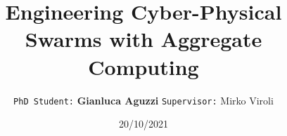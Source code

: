 

\title{
  {\fontfamily{\playfairfamily}\selectfont
  Engineering Cyber-Physical Swarms with Aggregate Computing
  }  
}
\author[G.Aguzzi]{
  \texttt{PhD Student:} \textbf{Gianluca Aguzzi}
  \texttt{Supervisor:} Mirko Viroli
}
\date{ 20/10/2021 }
\talk{ }
